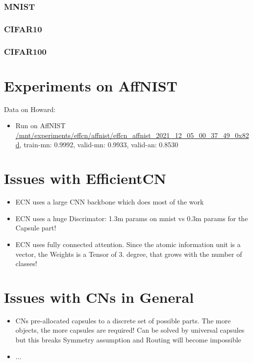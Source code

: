 \documentclass{article}
\begin{document}
\subsubsection{MNIST}
\subsubsection{CIFAR10}
\subsubsection{CIFAR100}
  

\section{Experiments on AffNIST}

Data on Howard:
\begin{itemize}
	\item Run on AffNIST \url{/mnt/experiments/effcn/affnist/effcn_affnist_2021_12_05_00_37_49_0x82d}, train-mn: 0.9992, valid-mn: 0.9933, valid-an: 0.8530
\end{itemize}

\section{Issues with EfficientCN}

\begin{itemize}
	\item ECN uses a large CNN backbone which does most of the work
	\item ECN uses a huge Discrimator: 1.3m params on mnist vs 0.3m params for the Capsule part!
	\item ECN uses fully connected attention. Since the atomic information unit is a vector, the Weights is a Tensor of 3. degree, that grows with the number of classes!
\end{itemize}

\section{Issues with CNs in General}

\begin{itemize}
	\item CNs pre-allocated capsules to a discrete set of possible parts. The more objects, the more capsules are required! Can be solved by universal capsules but this breaks Symmetry assumption and Routing will become impossible
	\item ...
\end{itemize}
\end{document}
